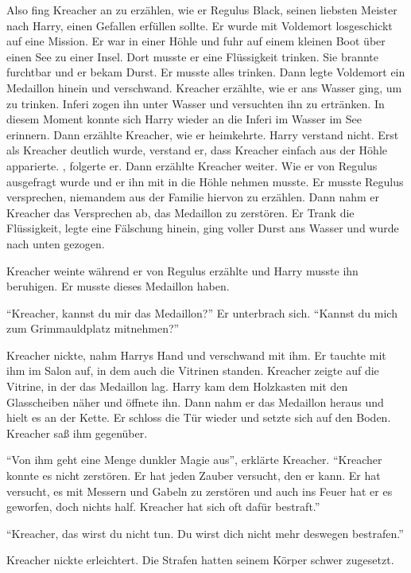 Also fing Kreacher an zu erzählen, wie er Regulus Black, seinen liebsten Meister nach Harry, einen Gefallen erfüllen sollte. Er wurde mit Voldemort losgeschickt auf eine Mission. Er war in einer Höhle und fuhr auf einem kleinen Boot über einen See zu einer Insel. Dort musste er eine Flüssigkeit trinken. Sie brannte furchtbar und er bekam Durst. Er musste alles trinken. Dann legte Voldemort ein Medaillon hinein und verschwand. Kreacher erzählte, wie er ans Wasser ging, um zu trinken. Inferi zogen ihn unter Wasser und versuchten ihn zu ertränken. In diesem Moment konnte sich Harry wieder an die Inferi im Wasser im See erinnern. Dann erzählte Kreacher, wie er heimkehrte. Harry verstand nicht. Erst als Kreacher deutlich wurde, verstand er, dass Kreacher einfach aus der Höhle apparierte. , folgerte er.  Dann erzählte Kreacher weiter. Wie er von Regulus ausgefragt wurde und er ihn mit in die Höhle nehmen musste. Er musste Regulus versprechen, niemandem aus der Familie hiervon zu erzählen. Dann nahm er Kreacher das Versprechen ab, das Medaillon zu zerstören. Er Trank die Flüssigkeit, legte eine Fälschung hinein, ging voller Durst ans Wasser und wurde nach unten gezogen.

Kreacher weinte während er von Regulus erzählte und Harry musste ihn beruhigen. Er musste dieses Medaillon haben.

\enquote{Kreacher, kannst du mir das Medaillon\abs?} Er unterbrach sich. \enquote{Kannst du mich zum Grimmauldplatz mitnehmen?}

Kreacher nickte, nahm Harrys Hand und verschwand mit ihm. Er tauchte mit ihm im Salon auf, in dem auch die Vitrinen standen. Kreacher zeigte auf die Vitrine, in der das Medaillon lag. Harry kam dem Holzkasten mit den Glasscheiben näher und öffnete ihn. Dann nahm er das Medaillon heraus und hielt es an der Kette. Er schloss die Tür wieder und setzte sich auf den Boden. Kreacher saß ihm gegenüber.

\enquote{Von ihm geht eine Menge dunkler Magie aus}, erklärte Kreacher. \enquote{Kreacher konnte es nicht zerstören. Er hat jeden Zauber versucht, den er kann. Er hat versucht, es mit Messern und Gabeln zu zerstören und auch ins Feuer hat er es geworfen, doch nichts half. Kreacher hat sich oft dafür bestraft.}

\enquote{Kreacher, das wirst du nicht tun. Du wirst dich nicht mehr deswegen bestrafen.}

Kreacher nickte erleichtert. Die Strafen hatten seinem Körper schwer zugesetzt.

